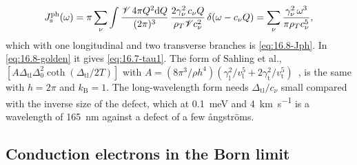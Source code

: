\begin{equation*}
  J_{\mathrm{s}}^{\mathrm{ph}}(\omega) = \pi\sum_\nu\int\frac{\mathscr{V}\,4\pi Q^2\mathrm{d} Q}{(2\pi)^3}\,\frac{2\gamma_\nu^2\,c_\nu Q}{\rho_T\mathscr{V} c_\nu^2}\,\delta(\omega - c_\nu Q)
  = \sum_\nu\frac{\gamma_\nu^2\,\omega^3}{\pi\rho_Tc_\nu^5} ,
\end{equation*}
which with one longitudinal and two transverse branches is \cref{eq:16.8-Jph}. In \cref{eq:16.8-golden} it gives \cref{eq:16.7-tau1}. The form of Sahling et al., $[A\Delta_{\mathrm{tl}}\Delta_0^2\coth(\Delta_{\mathrm{tl}}/2T)]$ with $A = (8\pi^3/\rho h^4)(\gamma_{\mathrm{l}}^2/v_{\mathrm{l}}^5 + 2\gamma_{\mathrm{t}}^2/v_{\mathrm{t}}^5)$~\cite[Eqs.~(4), (5)]{sahling2010anomalous}, is the same with $h = 2\pi$ and $k_{\mathrm{B}} = 1$. The long-wavelength form needs $\Delta_{\mathrm{tl}}/c_\nu$ small compared with the inverse size of the defect, which at \SI{0.1}{meV} and \SI{4}{km.s^{-1}} is a wavelength of \SI{165}{nm} against a defect of a few \r{a}ngstr\"oms.

\subsection*{Conduction electrons in the Born limit}

